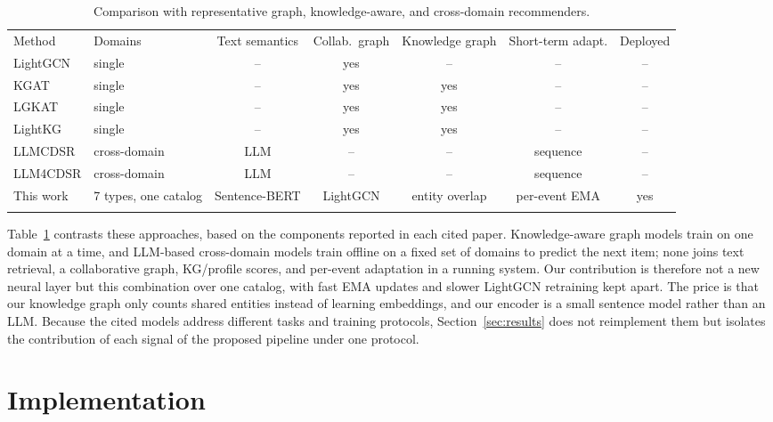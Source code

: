 \documentclass[3p,times,procedia]{elsarticle}
\begin{document}
\begin{table}[!ht]
\centering
\caption{Comparison with representative graph, knowledge-aware, and cross-domain recommenders.}
\label{tab:novelty}
\footnotesize
\begin{tabular*}{\hsize}{@{\extracolsep{\fill}}llccccc@{}}
\toprule
Method & Domains & Text semantics & Collab.\ graph & Knowledge graph & Short-term adapt. & Deployed \\
\colrule
LightGCN \cite{he2020lightgcn} & single & -- & yes & -- & -- & -- \\
KGAT \cite{wang2019kgat} & single & -- & yes & yes & -- & -- \\
LGKAT \cite{hassanzadeh2025lgkat} & single & -- & yes & yes & -- & -- \\
LightKG \cite{li2025lightkg} & single & -- & yes & yes & -- & -- \\
LLMCDSR \cite{xin2025llmcdsr} & cross-domain & LLM & -- & -- & sequence & -- \\
LLM4CDSR \cite{liu2025llm4cdsr} & cross-domain & LLM & -- & -- & sequence & -- \\
This work & 7 types, one catalog & Sentence-BERT & LightGCN & entity overlap & per-event EMA & yes \\
\botrule
\end{tabular*}
\end{table}

Table~\ref{tab:novelty} contrasts these approaches, based on the components reported in each cited paper. Knowledge-aware graph models train on one domain at a time, and LLM-based cross-domain models train offline on a fixed set of domains to predict the next item; none joins text retrieval, a collaborative graph, KG/profile scores, and per-event adaptation in a running system. Our contribution is therefore not a new neural layer but this combination over one catalog, with fast EMA updates and slower LightGCN retraining kept apart. The price is that our knowledge graph only counts shared entities instead of learning embeddings, and our encoder is a small sentence model rather than an LLM. Because the cited models address different tasks and training protocols, Section~\ref{sec:results} does not reimplement them but isolates the contribution of each signal of the proposed pipeline under one protocol.

\section{Implementation}
\label{sec:implementation}
\end{document}
